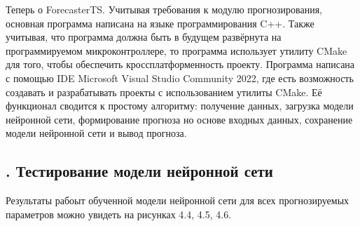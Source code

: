 {  \par \redline Теперь о ForecasterTS. Учитывая требования к модулю прогнозирования, основная программа написана на языке программирования C++. Также учитывая, что программа должна быть в будущем развёрнута на программируемом микроконтроллере, то программа использует утилиту CMake для того, чтобы обеспечить кроссплатформенность проекту. Программа написана с помощью IDE Microsoft Visual Studio Community 2022, где есть возможность создавать и разрабатывать проекты с использованием утилиты CMake. Её функционал сводится к простому алгоритму: получение данных, загрузка модели нейронной сети, формирование прогноза но основе входных данных, сохранение модели нейронной сети и вывод прогноза. 

}

\subtitlespace

\subsection*{ 
  \gostTitleFont
  \redline
  \thechaptercntr .\thesubchaptercntr \spc 
  Тестирование модели нейронной сети
} \addtocounter{subchaptercntr}{1} 
  
\subtitlespace
  
{\gostFont

  \par \redline Результаты рабоыт обученной модели нейронной сети для всех прогнозируемых параметров можно увидеть на рисунках 4.4, 4.5, 4.6. 

}

\setcounter{subchaptercntr}{1}
\setcounter{formulacntr}{1}
\setcounter{imagecntr}{1}
